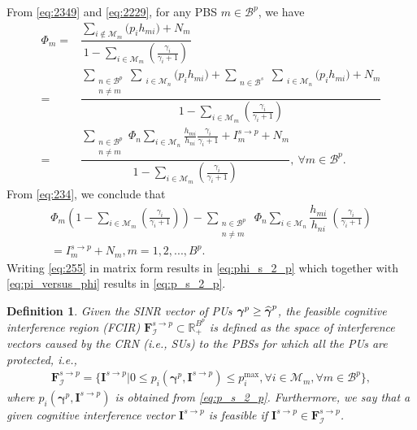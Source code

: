\documentclass[journal,twoside]{IEEEtran}
\newcommand{\B}{\mathcal{B}}
\newcommand{\M}{\mathcal{M}}
\newcommand{\gammahatbold}{\widehat{\mbox{\boldmath{$\gamma$}}}}
\newcommand{\gammabold}{\boldsymbol{\gamma}}
\newcommand{\hup}[2]{h_{#1 #2}}
\newtheorem {definition}{Definition}
\begin{document}
	\begin{IEEEproof}
		From \eqref{eq:2349} and \eqref{eq:2229}, for any PBS $m\in\B^p$, we have
		\begin{align}
		\label{eq:234}
			\Phi_{m}
					= & \dfrac{\sum\limits_{i\notin\M_m} {\!\!\!\big(p_i \hup{m}{i} \big)} + N_{m}} {1- \! \sum\limits_{i\in\M_m}\!\!\! \left(\frac{\gamma_i}{\gamma_i+1}\right)}
					\nonumber \\
			= &  \dfrac{ \sum\limits_{\substack{n\in\B^p\\ n\neq m}} \!\!\! \sum\limits_{\ \ i\in\M_n} {\!\!\!\big(p_i \hup{m}{i} \big)} + \sum\limits_{\substack{n\in\B^s}} \!\!\! \sum\limits_{\ \ i\in\M_n} {\!\!\!\big(p_i \hup{m}{i} \big)} + N_{m}}
			  {1- \! \sum\limits_{i\in\M_m}\!\!\! \left( \frac{\gamma_i}{\gamma_i+1} \right)}
			\nonumber \\
			 = & \dfrac{\sum\limits_{\substack{n\in\B^p\\ n\neq m}} \!\!\! \Phi_{n} \sum\limits_{i\in\M_{n}}{ \frac{\hup{m}{i}}{\hup{n}{i}} \frac{\gamma_i}{\gamma_i + 1} } +I_m^{s \rightarrow p} + N_{m}} {1- \! \sum\limits_{i\in\M_m}\!\!\! \left( \frac{\gamma_i}{\gamma_i+1} \right)}, \ \forall m\in\B^p.
		\end{align}
		From \eqref{eq:234}, we conclude that
		\begin{align}
			\label{eq:255}
			\Phi_{m} \left( 1- \! \sum\limits_{i\in\M_m}\!\!\! \left( \frac{\gamma_i}{\gamma_i+1} \right) \right) -
			\sum\limits_{\substack{n\in\B^p\\ n\neq m}} \ \! \Phi_{n} \! \sum\limits_{i\in\M_{n}}{ \! \dfrac{\hup{m}{i}}{\hup{n}{i}}\ \!\left(\frac{\gamma_i}{\gamma_i+1}\right) } \nonumber \\
			= I^{s \rightarrow p}_m + N_{m},  m=1,2,...,B^p.
		\end{align}
		Writing \eqref{eq:255} in matrix form results in \eqref{eq:phi_s_2_p} which together with \eqref{eq:pi_versus_phi} results in \eqref{eq:p_s_2_p}.
	\end{IEEEproof}
	\begin{definition}
	\label{def:feasible_interference}
		Given the SINR vector of PUs $\gammabold^{p}\geq \gammahatbold^p$, the feasible cognitive interference region (FCIR) $\mathbf{F}^{s\rightarrow p}_{\mathbf{\mathcal{I}}}\subset \mathbb{R}_{+}^{B^p}$ is defined as the space of interference vectors caused by the CRN (i.e., SUs) to the PBSs for which all the PUs are protected, i.e., \begin{align}
		\label{eq:32}
			\mathbf{F}^{s\rightarrow p}_{\mathbf{\mathcal{I}}} \! = \! \{\mathbf{I}^{s\rightarrow p} | 0 \leq p_i\left(\! \gammabold^p,\mathbf{I}^{s\rightarrow p} \! \right) \! \leq \! p_i^{\mathrm{max}} \! , \forall i\in\M_m, \forall m\in\B^p \},
		\end{align}
		where $p_i\left( \gammabold^p,\mathbf{I}^{s\rightarrow p} \right)$ is obtained from \eqref{eq:p_s_2_p}. Furthermore, we say that a given cognitive interference vector $\mathbf{I}^{s\rightarrow p}$ is feasible if $\mathbf{I}^{s\rightarrow p}\in \mathbf{F}_{\mathcal{I}}^{s\rightarrow p}$.
	\end{definition}
	
\end{document}
